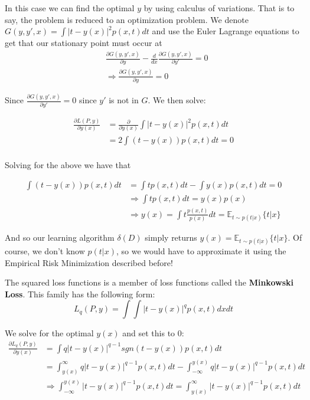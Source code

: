 \documentclass[]{article}
\theoremstyle{mattstyle}
\theoremstyle{definition}
\begin{document}
In this case we can find the optimal $y$ by using calculus of variations. That is to say, the problem is reduced to an optimization problem. We denote $G(y, y', x) = \int | t - y(x) |^2 p(x, t) dt$ and use the Euler Lagrange equations to get that our stationary point must occur at 
\begin{align*}
&\frac{\partial G(y, y', x)}{\partial y} - \frac{d}{dx}\frac{\partial G(y, y', x)}{\partial y'} = 0\\
&\Rightarrow \frac{\partial G(y, y', x)}{\partial y}=0
\end{align*}

Since $\frac{\partial G(y, y', x)}{\partial y'}=0$ since $y'$ is not in $G$. We then solve:

\begin{align*}
\frac{\partial L(P,y)}{\partial y(x)} &= \frac{\partial}{\partial y(x)}\int | t - y(x) |^2 p(x, t) dt\\
&=2 \int (t - y(x)) p(x, t) dt = 0\\
\end{align*}

Solving for the above we have that

\begin{align*}
\int (t - y(x)) p(x, t) dt &= \int t p(x, t) dt - \int y(x) p(x, t) dt = 0\\
&\Rightarrow \int t p(x, t) dt =  y(x)p(x) \\
&\Rightarrow y(x) = \int t \frac{p(x, t)}{p(x)} dt = \mathbb{E}_{t \sim p(t|x)}\{t|x\}
\end{align*}

And so our learning algorithm $\delta(D)$ simply returns $y(x) = \mathbb{E}_{t \sim p(t|x)}\{t|x\}$. Of course, we don't know $p(t|x)$, so we would have to approximate it using the Empirical Risk Minimization described before!


The squared loss functions is a member of loss functions called the \textbf{Minkowski Loss}. This family has the following form:
\begin{equation}
L_q(P,y) = \int\int |t-y(x)|^q p(x,t)dxdt
\end{equation}

We solve for the optimal $y(x)$ and set this to 0:
\begin{align}
\frac{\partial L_q(P,y)}{\partial y(x)} &= \int q|t-y(x)|^{q-1} sgn(t-y(x)) p(x,t)dt\\
&= \int_{y(x)}^{\infty} q|t-y(x)|^{q-1}p(x,t)dt-\int_{-\infty}^{y(x)} q|t-y(x)|^{q-1}p(x,t)dt\\
&\Rightarrow \int_{-\infty}^{y(x)} |t-y(x)|^{q-1}p(x,t)dt = \int_{y(x)}^{\infty} |t-y(x)|^{q-1}p(x,t)dt
\end{align}
\end{document}
